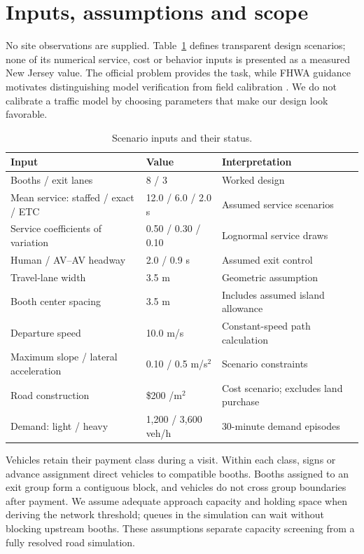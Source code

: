 \documentclass[12pt,letterpaper]{article}
\begin{document}
\section{Inputs, assumptions and scope}
No site observations are supplied. Table~\ref{tab:inputs} defines transparent design scenarios; none of its numerical service, cost or behavior inputs is presented as a measured New Jersey value. The official problem provides the task, while FHWA guidance motivates distinguishing model verification from field calibration \cite{fhwa}. We do not calibrate a traffic model by choosing parameters that make our design look favorable.
\begin{table}[htbp]\centering\small\caption{Scenario inputs and their status.}\label{tab:inputs}\begin{tabular}{@{}p{.34\linewidth}p{.25\linewidth}p{.32\linewidth}@{}}\toprule
Input & Value & Interpretation\\\midrule
Booths / exit lanes & 8 / 3 & Worked design\\
Mean service: staffed / exact / ETC & 12.0 / 6.0 / 2.0 s & Assumed service scenarios\\
Service coefficients of variation & 0.50 / 0.30 / 0.10 & Lognormal service draws\\
Human / AV--AV headway & 2.0 / 0.9 s & Assumed exit control\\
Travel-lane width & 3.5 m & Geometric assumption\\
Booth center spacing & 3.5 m & Includes assumed island allowance\\
Departure speed & 10.0 m/s & Constant-speed path calculation\\
Maximum slope / lateral acceleration & 0.10 / 0.5 m/s$^2$ & Scenario constraints\\
Road construction & \$200 /m$^2$ & Cost scenario; excludes land purchase\\
Demand: light / heavy & 1,200 / 3,600 veh/h & 30-minute demand episodes\\
\bottomrule\end{tabular}\end{table}
Vehicles retain their payment class during a visit. Within each class, signs or advance assignment direct vehicles to compatible booths. Booths assigned to an exit group form a contiguous block, and vehicles do not cross group boundaries after payment. We assume adequate approach capacity and holding space when deriving the network threshold; queues in the simulation can wait without blocking upstream booths. These assumptions separate capacity screening from a fully resolved road simulation.
\end{document}
